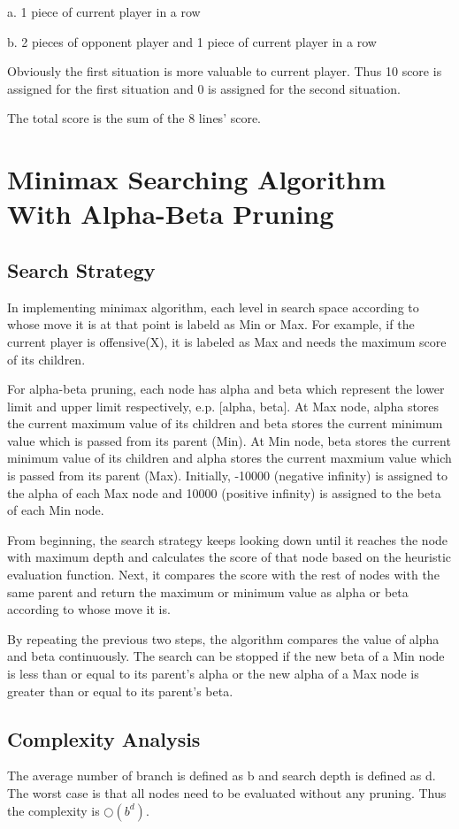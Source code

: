 \documentclass[a4paper]{scrartcl}
\begin{document}
a. 1 piece of current player in a row 

b. 2 pieces of opponent player and 1 piece of current player in a row 

Obviously the first situation is more valuable to current player. Thus 10
score is assigned for the first situation and 0 is assigned for the second
situation.

The total score is the sum of the 8 lines' score.

\section{Minimax Searching Algorithm With Alpha-Beta Pruning}
\label{sec:org935be9e}
\subsection{Search Strategy}
\label{sec:orgc4ad00c}
In implementing minimax algorithm, each level in search space according to
whose move it is at that point is labeld as Min or Max. For example, if the
current player is offensive(X), it is labeled as Max and needs the maximum
score of its children.

For alpha-beta pruning, each node has alpha and beta which represent the
lower limit and upper limit respectively, e.p. [alpha, beta]. At Max node,
alpha stores the current maximum value of its children and beta stores the
current minimum value which is passed from its parent (Min). At Min node,
beta stores the current minimum value of its children and alpha stores the
current maxmium value which is passed from its parent (Max). Initially,
-10000 (negative infinity) is assigned to the alpha of each Max node and
10000 (positive infinity) is assigned to the beta of each Min node.

From beginning, the search strategy keeps looking down until it reaches the
node with maximum depth and calculates the score of that node based on the
heuristic evaluation function. Next, it compares the score with the rest of
nodes with the same parent and return the maximum or minimum value as alpha
or beta according to whose move it is.

By repeating the previous two steps, the algorithm compares the value of
alpha and beta continuously. The search can be stopped if the new beta of a
Min node is less than or equal to its parent's alpha or the new alpha of a
Max node is greater than or equal to its parent's beta.

\subsection{Complexity Analysis}
\label{sec:orgdd63797}
The average number of branch is defined as b and search depth is defined as
d. The worst case is that all nodes need to be evaluated without any pruning.
Thus the complexity is \(\bigcirc(b^d)\). 
\end{document}

